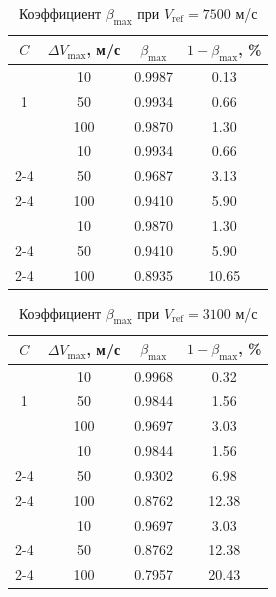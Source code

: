 \begin{table}[!h]
\centering
\caption{Коэффициент $\beta_{\max}$ при $V_{\mathrm{ref}} = 7500$ м/с}
\label{tab::beta_examples_leo}
\begin{tabular}{|c|c|c|c|}
    \hline
    $C$ & $\Delta V_{\max}$, м/с & $\beta_{\max}$ & $1-\beta_{\max}$, \% \\
    \hline
    \multirow{3}{*}{1}  & 10  & 0.9987 & 0.13 \\
    \cline{2-4}
       & 50  & 0.9934 & 0.66 \\
    \cline{2-4}
       & 100 & 0.9870 & 1.30 \\
    \hhline{|=|=|=|=|}
    \multirow{3}{*}{5}  & 10  & 0.9934 & 0.66 \\
    \cline{2-4}
       & 50  & 0.9687 & 3.13 \\
    \cline{2-4}
       & 100 & 0.9410 & 5.90 \\
    \hhline{|=|=|=|=|}
    \multirow{3}{*}{10} & 10  & 0.9870 & 1.30 \\
    \cline{2-4}
       & 50  & 0.9410 & 5.90 \\
    \cline{2-4}
       & 100 & 0.8935 & 10.65 \\
    \hline
\end{tabular}
\end{table}

\begin{table}[!h]
\centering
\caption{Коэффициент $\beta_{\max}$ при $V_{\mathrm{ref}} = 3100$ м/с}
\label{tab::beta_examples_geo}
\begin{tabular}{|c|c|c|c|}
    \hline
    $C$ & $\Delta V_{\max}$, м/с & $\beta_{\max}$ & $1-\beta_{\max}$, \% \\
    \hline
    \multirow{3}{*}{1}  & 10  & 0.9968 & 0.32 \\
    \cline{2-4}
       & 50  & 0.9844 & 1.56 \\
    \cline{2-4}
       & 100 & 0.9697 & 3.03 \\
    \hhline{|=|=|=|=|}
    \multirow{3}{*}{5}  & 10  & 0.9844 & 1.56 \\
    \cline{2-4}
       & 50  & 0.9302 & 6.98 \\
    \cline{2-4}
       & 100 & 0.8762 & 12.38 \\
    \hhline{|=|=|=|=|}
    \multirow{3}{*}{10} & 10  & 0.9697 & 3.03 \\
    \cline{2-4}
       & 50  & 0.8762 & 12.38 \\
    \cline{2-4}
       & 100 & 0.7957 & 20.43 \\
    \hline
\end{tabular}
\end{table}

